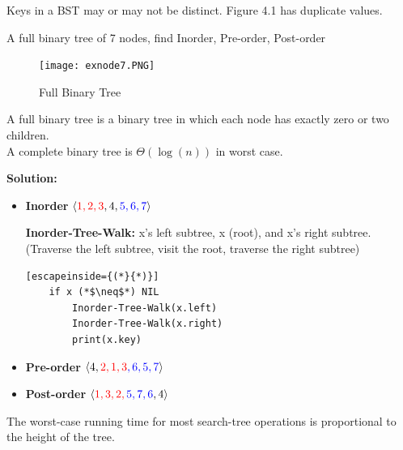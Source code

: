 \documentclass[11pt,fleqn]{book}
\begin{document}
\begin{remark}
Keys in a BST may or may not be distinct. Figure 4.1 has duplicate values. 
\end{remark}
\vspace{1em}
\begin{example}
A full binary tree of 7 nodes, find Inorder, Pre-order, Post-order 
\begin{figure}[h!]
    \centering
    \texttt{[image: exnode7.PNG]}
    \caption{Full Binary Tree}
    \label{fig:my_label}
\end{figure}
\end{example}
\vspace{1em}
\begin{remark}
A full binary tree is a binary tree in which each node has exactly zero or two children. \\
A complete binary tree is $\Theta(\log(n))$ in worst case.
\end{remark}
\vspace{1em}
\textbf{Solution:}
\begin{itemize}
    \item \textbf{Inorder} $\langle \color{red}1,2,3\color{black},4,\color{blue}5,6,7\color{black} \rangle$
    \begin{definition}
    \textbf{Inorder-Tree-Walk: } x's \color{red}left \color{black} subtree, x (root), and x's \color{blue}right \color{black}  subtree. \\
    (Traverse the left subtree, visit the root, traverse the right subtree)
\begin{lstlisting}[escapeinside={(*}{*)}]
    if x (*$\neq$*) NIL 
        Inorder-Tree-Walk(x.left)
        Inorder-Tree-Walk(x.right)
        print(x.key)
\end{lstlisting}
    \end{definition}
    \item \textbf{Pre-order} $\langle 4,\color{red}2,1,3\color{blue},6,5,7\color{black} \rangle$
    \item \textbf{Post-order} $\langle \color{red}1,3,2,\color{blue}5,7,6\color{black},4 \rangle$
\end{itemize}
\begin{remark}
The worst-case running time for most search-tree operations is proportional to the height of the tree.
\end{remark}
\vspace{1em} 
\end{document}
